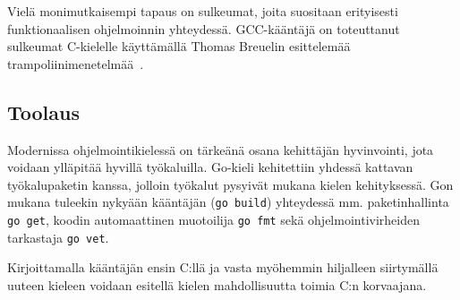 Vielä monimutkaisempi tapaus on sulkeumat, joita suositaan erityisesti
funktionaalisen ohjelmoinnin yhteydessä. GCC-kääntäjä on toteuttanut sulkeumat
C-kielelle käyttämällä Thomas Breuelin esittelemää
trampoliinimenetelmää~\citep{gccnested, cppclosure}.

\subsection{Toolaus}

Modernissa ohjelmointikielessä on tärkeänä osana kehittäjän hyvinvointi, jota
voidaan ylläpitää hyvillä työkaluilla. Go-kieli kehitettiin yhdessä kattavan
työkalupaketin kanssa, jolloin työkalut pysyivät mukana kielen kehityksessä.
Gon mukana tuleekin nykyään kääntäjän (\texttt{go build}) yhteydessä mm.
paketinhallinta \texttt{go get}, koodin automaattinen muotoilija \texttt{go
fmt} sekä ohjelmointivirheiden tarkastaja \texttt{go vet}. 

Kirjoittamalla kääntäjän ensin C:llä ja vasta myöhemmin hiljalleen siirtymällä
uuteen kieleen voidaan esitellä kielen mahdollisuutta toimia C:n korvaajana.
